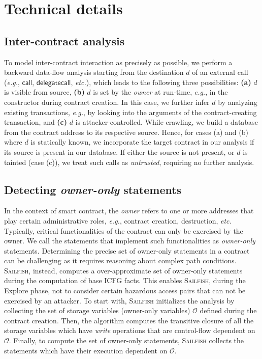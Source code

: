\documentclass[conference, romanappendices]{tex/IEEEtran}
\theoremstyle{bfnote}
\newcommand{\toolname}{\textsc{Sailfish}\xspace}
\newcommand{\explore}{{\sc Explore}\xspace}
\newcommand{\smart}{smart contract}
\newcommand{\haz}{{hazardous access}\xspace}
\newcommand{\etc}{\textit{etc.}}
\newcommand{\eg}{\textit{e.g.}}
\begin{document}
\section{Technical details}
\label{app:technical_details}

\subsection{Inter-contract analysis}
\label{app:inter_contract_analysis}
To model inter-contract interaction as precisely as possible, we perform a backward data-flow analysis starting from the destination $d$ of an external call (\eg, $\mathsf{call}$, $\mathsf{delegatecall}$, \etc), which leads to the following three possibilities:
\textbf{(a)} $d$ is visible from source,
\textbf{(b)} $d$ is set by the \textit{owner} at run-time, \eg, in the constructor during contract creation.
In this case, we further infer $d$ by analyzing existing transactions, \eg, by looking into the arguments of the contract-creating transaction, and
\textbf{(c)} $d$ is attacker-controlled.
While crawling, we build a database from the contract address to its respective source.
Hence, for cases (a) and (b) where $d$ is statically known, we incorporate the target contract in our analysis if its source is present in our database.
If either the source is not present, or $d$ is tainted (case (c)), we treat such calls as \textit{untrusted}, requiring no further analysis.

\subsection{Detecting \textit{owner-only} statements}
\label{app:owner_only_statements}
In the context of \smart, the \textit{owner} refers to one or more addresses that play certain administrative roles, \eg, contract creation, destruction, \etc{}
Typically, critical functionalities of the contract can only be exercised by the owner.
We call the statements that implement such functionalities as \textit{owner-only} statements.
Determining the precise set of owner-only statements in a contract can be challenging as it requires reasoning about complex path conditions.
\toolname, instead, computes a over-approximate set of owner-only statements during the computation of base ICFG facts.
This enables \toolname, during the \explore phase, not to consider certain \haz pairs that can not be exercised by an attacker.
To start with, \toolname initializes the analysis by collecting the set of storage variables (owner-only variables) $\mathcal{O}$ defined during the contract creation.
Then, the algorithm computes the transitive closure of all the storage variables which have \textit{write} operations that are control-flow dependent on $\mathcal{O}$.
Finally, to compute the set of owner-only statements, \toolname collects the statements which have their execution dependent on $\mathcal{O}$.
 
\end{document}
